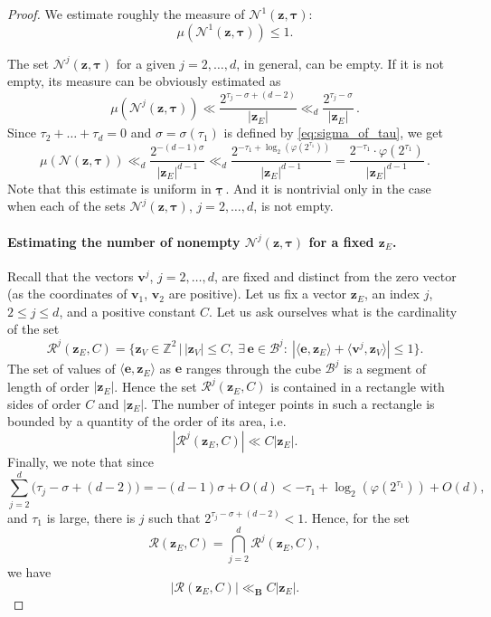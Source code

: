 \documentclass[10pt,a4paper]{amsart}
\newcommand{\Z}{\mathbb{Z}}
\newcommand{\bB}{\mathbf{B}}
\newcommand{\cB}{\mathcal{B}}
\newcommand{\cN}{\mathcal{N}}
\newcommand{\cR}{\mathcal{R}}
\renewcommand{\leq}{\leqslant}
\renewcommand{\vec}[1]{\mathbf{#1}}
\begin{document}
\begin{proof}
  We estimate roughly the measure of $\cN^1(\vec z,\pmb\tau)$:
  \[
    \mu(\cN^1(\vec z,\pmb\tau))\leq1.
  \]
  
  The set $\cN^j(\vec z,\pmb\tau)$ for a given $j=2,\ldots,d$, in general, can be empty. If it is not empty, its measure can be obviously estimated as
  \[
    \mu(\cN^j(\vec z,\pmb\tau))\ll
    \frac{2^{\tau_j-\sigma+(d-2)}}{|\vec z_E|}\ll_d
    \frac{2^{\tau_j-\sigma}}{|\vec z_E|}\,.
  \]
  Since $\tau_2+\ldots+\tau_d=0$ and $\sigma=\sigma(\tau_1)$ is defined by \eqref{eq:sigma_of_tau}, we get
  \begin{equation}\label{eq:estimating_measure_of_N}
    \mu(\cN(\vec z,\pmb\tau))\ll_d
    \frac{2^{-(d-1)\sigma}}{|\vec z_E|^{d-1}}\ll_d
    \frac{2^{-\tau_1+\log_2(\varphi(2^{\tau_1}))}}{|\vec z_E|^{d-1}}=
    \frac{2^{-\tau_1}\cdot\varphi(2^{\tau_1})}{|\vec z_E|^{d-1}}\,.
  \end{equation}
  Note that this estimate is uniform in $\underline{\pmb\tau}$\,. And it is nontrivial only in the case when each of the sets $\cN^j(\vec z,\pmb\tau)$, $j=2,\ldots,d$, is not empty.
  
  \paragraph{Estimating the number of nonempty $\cN^j(\vec z,\pmb\tau)$ for a fixed $\vec z_E$.}
  
  Recall that the vectors $\vec v^j$, $j=2,\ldots,d$, are fixed and distinct from the zero vector (as the coordinates of $\vec v_1$, $\vec v_2$ are positive). Let us fix a vector $\vec z_E$, an index $j$, $2\leq j\leq d$, and a positive constant $C$. Let us ask ourselves what is the cardinality of the set
  \[
    \cR^j(\vec z_E,C)=
    \Big\{\vec z_V\in\Z^2 \,\Big|\, |\vec z_V|\leq C,\ \exists\,\vec e\in\cB^j:\ |\langle\vec e,\vec z_E\rangle+\langle\vec v^j,\vec z_V\rangle|\leq1 \Big\}.
  \]
  The set of values of $\langle\vec e,\vec z_E\rangle$ as $\vec e$ ranges through the cube $\cB^j$ is a segment of length of order $|\vec z_E|$. Hence the set $\cR^j(\vec z_E,C)$ is contained in a rectangle with sides of order $C$ and $|\vec z_E|$. The number of integer points in such a rectangle is bounded by a quantity of the order of its area, i.e.
  \[
    |\cR^j(\vec z_E,C)|\ll C|\vec z_E|.
  \]
  Finally, we note that since
  \[
    \sum_{j=2}^{d}\big(\tau_j-\sigma+(d-2)\big)=-(d-1)\sigma+O(d)<-\tau_1+\log_2(\varphi(2^{\tau_1}))+O(d),
  \]
  and $\tau_1$ is large, there is $j$ such that $2^{\tau_j-\sigma+(d-2)}<1$. Hence, for the set
  \[
    \cR(\vec z_E,C)=
    \bigcap_{j=2}^d\cR^j(\vec z_E,C),
  \]
  we have
  \begin{equation}\label{eq:estimate_on_R}
    |\cR(\vec z_E,C)|\ll_\bB C|\vec z_E|.
  \end{equation}
  

\end{proof}
\end{document}
